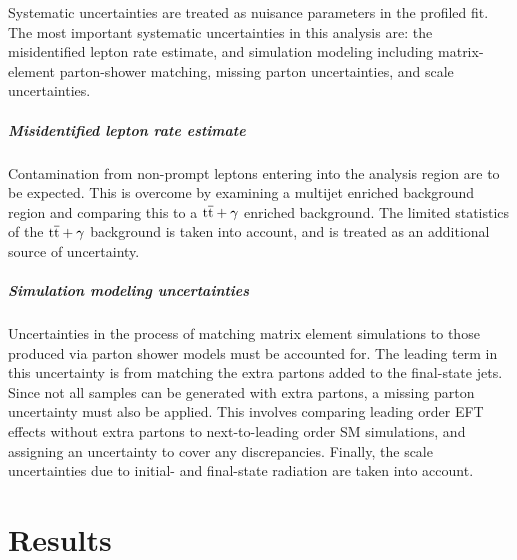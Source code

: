 \documentclass[12pt]{article}
\begin{document}
Systematic uncertainties are treated as nuisance parameters in the profiled fit. The most important systematic uncertainties in this analysis are: the misidentified lepton rate estimate, and simulation modeling including  matrix-element parton-shower matching, missing parton uncertainties, and scale uncertainties.

\subparagraph{Misidentified lepton rate estimate}

Contamination from non-prompt leptons entering into the analysis region are to be expected. This is overcome by examining a multijet enriched background region and comparing this to a $\mathrm{t\overline{t}}+\gamma$ enriched background. The limited statistics of the $\mathrm{t\overline{t}}+\gamma$ background is taken into account, and is treated as an additional source of uncertainty.

\subparagraph{Simulation modeling uncertainties}

Uncertainties in the process of matching matrix element simulations to those produced via parton shower models must be accounted for. The leading term in this uncertainty is from matching the extra partons added to the final-state jets. Since not all samples can be generated with extra partons, a missing parton uncertainty must also be applied. This involves comparing leading order EFT effects without extra partons to next-to-leading order SM simulations, and assigning an uncertainty to cover any discrepancies. Finally, the scale uncertainties due to initial- and final-state radiation are taken into account.

\section{Results}
\end{document}
